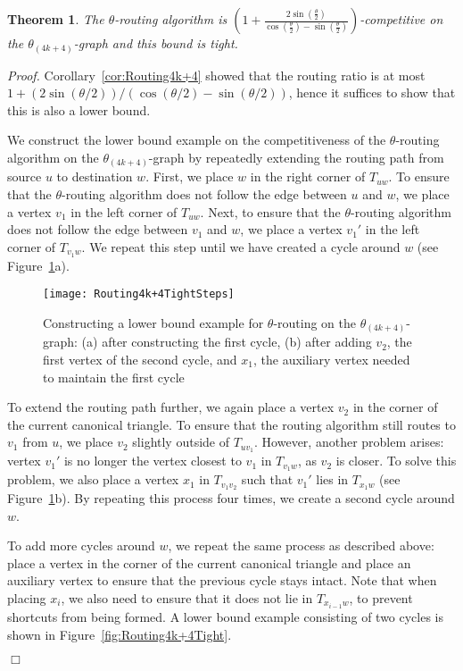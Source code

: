 \documentclass[12pt]{article}
\newtheorem{theo}[defin]{Theorem}
\newenvironment{theorem}{\begin{theo} \sl}{\end{theo}}
\newenvironment{proof}{\emph{Proof.}}{\hfill $\Box$\\}
\newcommand{\graph}[1]{\ensuremath{\theta_{(4 k + #1)}}-graph\xspace}
\newcommand{\canon}[2]{\ensuremath{T_{#1 #2}}}
\begin{document}
\begin{theorem}
  The $\theta$-routing algorithm is $\left( 1 + \frac{2 \sin \left( \frac{\theta}{2} \right)}{\cos \left( \frac{\theta}{2} \right) - \sin \left( \frac{\theta}{2} \right)} \right)$-competitive on the \graph{4} and this bound is tight. 
\end{theorem}
\begin{proof}
  Corollary~\ref{cor:Routing4k+4} showed that the routing ratio is at most $1 + (2 \sin (\theta/2)) / (\cos (\theta/2) - \sin (\theta/2))$, hence it suffices to show that this is also a lower bound. 

  We construct the lower bound example on the competitiveness of the $\theta$-routing algorithm on the \graph{4} by repeatedly extending the routing path from source $u$ to destination $w$. First, we place $w$ in the right corner of \canon{u}{w}. To ensure that the $\theta$-routing algorithm does not follow the edge between $u$ and $w$, we place a vertex $v_1$ in the left corner of \canon{u}{w}. Next, to ensure that the $\theta$-routing algorithm does not follow the edge between $v_1$ and $w$, we place a vertex $v_1'$ in the left corner of \canon{v_1}{w}. We repeat this step until we have created a cycle around $w$ (see Figure~\ref{fig:Routing4k+4TightSteps}a). 

  \begin{figure}[ht]
    \centering
    \texttt{[image: Routing4k+4TightSteps]}
    \caption{Constructing a lower bound example for $\theta$-routing on the \graph{4}: (a) after constructing the first cycle, (b) after adding $v_2$, the first vertex of the second cycle, and $x_1$, the auxiliary vertex needed to maintain the first cycle}
    \label{fig:Routing4k+4TightSteps}
  \end{figure}

  To extend the routing path further, we again place a vertex $v_2$ in the corner of the current canonical triangle. To ensure that the routing algorithm still routes to $v_1$ from $u$, we place $v_2$ slightly outside of \canon{u}{v_1}. However, another problem arises: vertex $v_1'$ is no longer the vertex closest to $v_1$ in \canon{v_1}{w}, as $v_2$ is closer. To solve this problem, we also place a vertex $x_1$ in \canon{v_1}{v_2} such that $v_1'$ lies in \canon{x_1}{w} (see Figure~\ref{fig:Routing4k+4TightSteps}b). By repeating this process four times, we create a second cycle around $w$. 

  To add more cycles around $w$, we repeat the same process as described above: place a vertex in the corner of the current canonical triangle and place an auxiliary vertex to ensure that the previous cycle stays intact. Note that when placing $x_i$, we also need to ensure that it does not lie in \canon{x_{i-1}}{w}, to prevent shortcuts from being formed. A lower bound example consisting of two cycles is shown in Figure~\ref{fig:Routing4k+4Tight}.


\end{proof}
\end{document}
